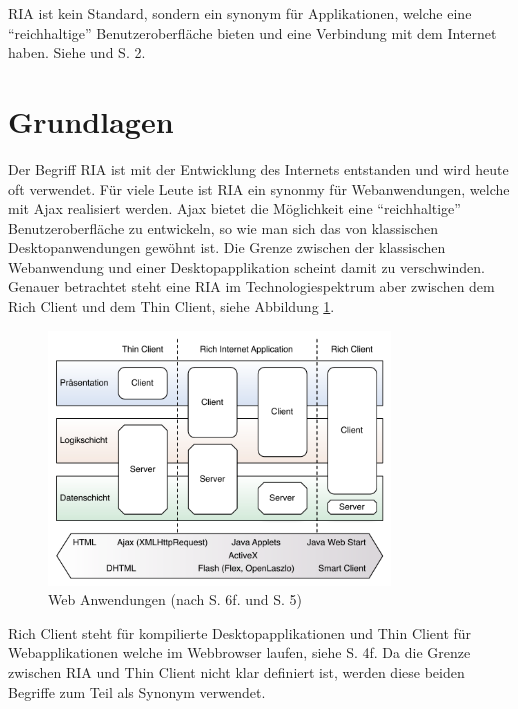   \ac{RIA} ist kein Standard, sondern ein synonym für Applikationen, welche
  eine ``reichhaltige'' Benutzeroberfläche bieten und eine Verbindung mit dem
  Internet haben. Siehe \cite{RichInternetApplication} und
  \cite{RichInternetApplicationsWhitePaper} S. 2.
  
  \section{Grundlagen}
  
  Der Begriff \ac{RIA} ist mit der Entwicklung des Internets entstanden und
  wird heute oft verwendet. Für viele Leute ist \ac{RIA} ein synonmy für
  Webanwendungen, welche mit \ac{Ajax} realisiert werden. \ac{Ajax} bietet die
  Möglichkeit eine ``reichhaltige'' Benutzeroberfläche zu entwickeln, so wie
  man sich das von klassischen Desktopanwendungen gewöhnt ist. Die Grenze
  zwischen der klassischen Webanwendung und einer Desktopapplikation scheint
  damit zu verschwinden. Genauer betrachtet steht eine \ac{RIA} im
  Technologiespektrum aber zwischen dem Rich Client und dem Thin Client, siehe
  Abbildung \ref{img:webanwendungen}.
  \newline
  
  \begin{figure}[h]
    \begin{center}
      \includegraphics[width=0.81\textwidth]{./image/webanwendungen.pdf}
      \caption{Web Anwendungen (nach \cite{DiplomarbeitStephanSchuster} S. 6f.
      und \cite{WebApplicationSolutions} S. 5)}
      \label{img:webanwendungen}
    \end{center}
  \end{figure}
  
  \noindent
  Rich Client steht für kompilierte Desktopapplikationen und Thin Client für
  Webapplikationen welche im Webbrowser laufen, siehe
  \cite{WebApplicationSolutions} S. 4f. Da die Grenze zwischen \ac{RIA} und
  Thin Client nicht klar definiert ist, werden diese beiden Begriffe zum Teil
  als Synonym verwendet.
  
